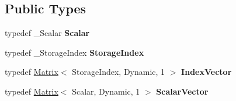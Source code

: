 \subsection*{Public Types}
\begin{DoxyCompactItemize}
\item 
\mbox{\label{class_eigen_1_1internal_1_1_mapped_super_nodal_matrix_a1c96dd142cf9bceec28f7ffedec30fe6}} 
typedef \+\_\+\+Scalar {\bfseries Scalar}
\item 
\mbox{\label{class_eigen_1_1internal_1_1_mapped_super_nodal_matrix_a76fd329b23f390646608265a60907913}} 
typedef \+\_\+\+Storage\+Index {\bfseries Storage\+Index}
\item 
\mbox{\label{class_eigen_1_1internal_1_1_mapped_super_nodal_matrix_a7607361d9fa602aefee60d2c8582f986}} 
typedef \mbox{\hyperlink{class_eigen_1_1_matrix}{Matrix}}$<$ Storage\+Index, Dynamic, 1 $>$ {\bfseries Index\+Vector}
\item 
\mbox{\label{class_eigen_1_1internal_1_1_mapped_super_nodal_matrix_ab2e273231613bd2ef35cac3e11a1234f}} 
typedef \mbox{\hyperlink{class_eigen_1_1_matrix}{Matrix}}$<$ Scalar, Dynamic, 1 $>$ {\bfseries Scalar\+Vector}
\end{DoxyCompactItemize}
